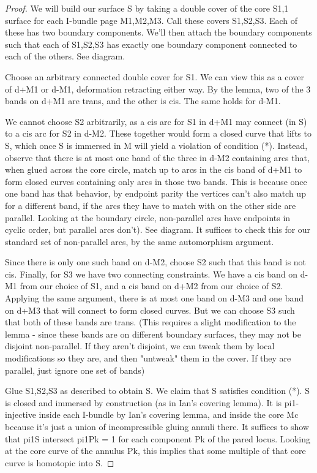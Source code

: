 \documentclass[12pt]{amsart}
\theoremstyle{definition}
\begin{document}
\begin{proof}
We will build our surface S by taking a double cover of the core S1,1 surface
for each I-bundle page M1,M2,M3. Call these covers S1,S2,S3. Each of these has
two boundary components. We'll then attach the boundary components such that
each of S1,S2,S3 has exactly one boundary component connected to each of the
others.  See diagram.

Choose an arbitrary connected double cover for S1. We can view this as a cover
of d+M1 or d-M1, deformation retracting either way. By the lemma, two of the
3 bands on d+M1 are trans, and the other is cis. The same holds for d-M1.

We cannot choose S2 arbitrarily, as a cis arc for S1 in d+M1 may connect (in S)
to a cis arc for S2 in d-M2. These together would form a closed curve that
lifts to S, which once S is immersed in M will yield a violation of condition
(*). Instead, observe that there is at most one band of the three in d-M2
containing arcs that, when glued across the core circle, match up to arcs in
the cis band of d+M1 to form closed curves containing only arcs in those two
bands. This is because once one band has that behavior, by endpoint parity the
vertices can't also match up for a different band, if the arcs they have to
match with on the other side are parallel. Looking at the boundary circle,
non-parallel arcs have endpoints in cyclic order, but parallel arcs don't). See
diagram. It suffices to check this for our standard set of non-parallel arcs,
by the same automorphism argument.

Since there is only one such band on d-M2, choose S2 such that this band is not
cis.  Finally, for S3 we have two connecting constraints. We have a cis band on
d-M1 from our choice of S1, and a cis band on d+M2 from our choice of S2.
Applying the same argument, there is at most one band on d-M3 and one band on
d+M3 that will connect to form closed curves. But we can choose S3 such that
both of these bands are trans. (This requires a slight modification to the
lemma - since these bands are on different boundary surfaces, they may not be
disjoint non-parallel. If they aren't disjoint, we can tweak them by local
modifications so they are, and then "untweak" them in the cover. If they are
parallel, just ignore one set of bands)

Glue S1,S2,S3 as described to obtain S. We claim that S satisfies condition
(*). S is closed and immersed by construction (as in Ian's covering lemma). It
is pi1-injective inside each I-bundle by Ian's covering lemma, and inside the
core Mc because it's just a union of incompressible gluing annuli there. It
suffices to show that pi1S intersect pi1Pk = 1 for each component Pk of the
pared locus. Looking at the core curve of the annulus Pk, this implies that
some multiple of that core curve is homotopic into S.


\end{proof}
\end{document}
